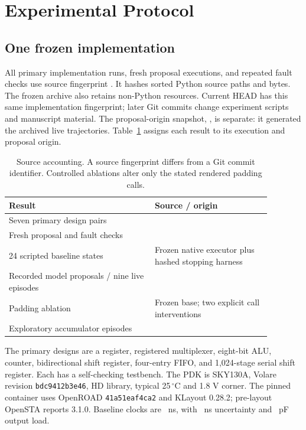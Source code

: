 \documentclass[runningheads]{llncs}
\newcommand{\code}[1]{\texttt{#1}}
\begin{document}
\section{Experimental Protocol}
\subsection{One frozen implementation}
All primary implementation runs, fresh proposal executions, and repeated
fault checks use source fingerprint \code{\FrozenSourceShort}. It hashes sorted
Python source paths and bytes. The frozen archive also retains non-Python
resources. Current HEAD has this same implementation fingerprint; later Git
commits change experiment scripts and manuscript material. The proposal-origin
snapshot, \code{\ProposalSourceShort}, is separate: it generated the archived
live trajectories. Table~\ref{tab:sources} assigns each result to its execution
and proposal origin.

\begin{table}[!htbp]\centering\small
\caption{Source accounting. A source fingerprint differs from a Git commit identifier. Controlled ablations alter only the stated rendered padding calls.}\label{tab:sources}
\begin{tabular}{@{}p{0.49\linewidth}p{0.39\linewidth}@{}}\toprule
Result & Source / origin\\\midrule
Seven primary design pairs & \code{\FrozenSourceShort}\\
Fresh proposal and fault checks & \code{\FrozenSourceShort}\\
24 scripted baseline states & Frozen native executor plus hashed stopping harness\\
Recorded model proposals / nine live episodes & \code{\ProposalSourceShort}\\
Padding ablation & Frozen base; two explicit call interventions\\
Exploratory accumulator episodes & \code{\FrozenSourceShort}\\\bottomrule
\end{tabular}\end{table}

The primary designs are a register, registered multiplexer, eight-bit ALU,
counter, bidirectional shift register, four-entry FIFO, and 1,024-stage serial
shift register. Each has a self-checking testbench. The PDK is SKY130A, Volare
revision \code{bdc9412b3e46}, HD library, typical 25\,$^{\circ}$C and 1.8 V
corner. The pinned container uses OpenROAD \code{41a51eaf4ca2} and KLayout
0.28.2; pre-layout OpenSTA reports 3.1.0. Baseline clocks are \ClockPeriod\ ns,
with \ClockUncertainty\ ns uncertainty and \OutputLoad\ pF output load.
\end{document}
